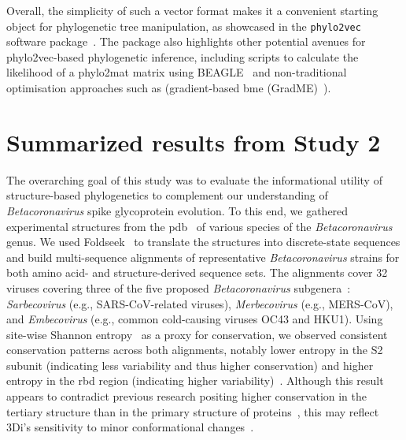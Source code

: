 Overall, the simplicity of such a vector format makes it a convenient starting object for phylogenetic tree manipulation, as showcased in the \texttt{phylo2vec} software package~\cite{scheidwasser2025}. The package also highlights other potential avenues for phylo2vec-based phylogenetic inference, including scripts to calculate the likelihood of a phylo2mat matrix using BEAGLE~\cite{ayres2019} and non-traditional optimisation approaches such as (gradient-based \gls{bme} (GradME)~\cite{penn2023}).

\section{Summarized results from Study 2}
The overarching goal of this study was to evaluate the informational utility of structure-based phylogenetics to complement our understanding of \textit{Betacoronavirus} spike glycoprotein evolution. To this end, we gathered experimental structures from the \gls{pdb}~\cite{berman2000, rose2010} of various species of the \textit{Betacoronavirus} genus. We used Foldseek~\cite{vankempen2024} to translate the structures into discrete-state sequences and build multi-sequence alignments of representative \textit{Betacoronavirus} strains for both amino acid- and structure-derived sequence sets. The alignments cover 32 viruses covering three of the five proposed \textit{Betacoronavirus} subgenera~\cite{woo2023}: \textit{Sarbecovirus} (e.g., SARS-CoV-related viruses), \textit{Merbecovirus} (e.g., MERS-CoV), and \textit{Embecovirus} (e.g., common cold-causing viruses OC43 and HKU1). Using site-wise Shannon entropy~\cite{shannon1948} as a proxy for conservation, we observed consistent conservation patterns across both alignments, notably lower entropy in the S2 subunit (indicating less variability and thus higher conservation) and higher entropy in the \gls{rbd} region (indicating higher variability)~\cite{scheidwasser2025a}. Although this result appears to contradict previous research positing higher conservation in the tertiary structure than in the primary structure of proteins~\cite{illergaard2009}, this may reflect 3Di's sensitivity to minor conformational changes~\cite{fullmer2025}.

